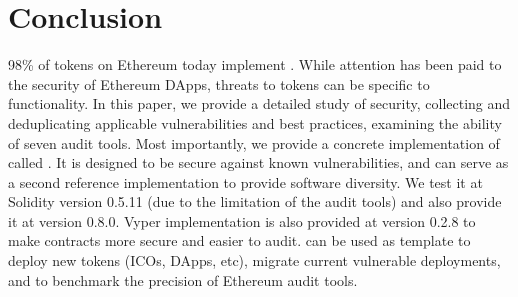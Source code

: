 
\section{Conclusion}

98\% of tokens on Ethereum today implement \erc. While attention has been paid to the security of Ethereum DApps, threats to tokens can be specific to \erc functionality. In this paper, we provide a detailed study of \erc security, collecting and deduplicating applicable vulnerabilities and best practices, examining the ability of seven audit tools. Most importantly, we provide a concrete implementation of \erc called \sys. It is designed to be secure against known vulnerabilities, and can serve as a second reference implementation to provide software diversity. We test it at Solidity version 0.5.11 (due to the limitation of the audit tools) and also provide it at version 0.8.0. Vyper implementation is also provided at version 0.2.8 to make \erc contracts more secure and easier to audit. \sys can be used as template to deploy new \erc tokens (\eg ICOs, DApps, etc), migrate current vulnerable deployments, and to benchmark the precision of Ethereum audit tools.




